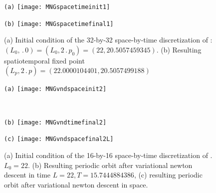 

\begin{figure}[ht]
\begin{minipage}[height=.32\textheight]{.45\textwidth}
\centering \small{\texttt{(a)}}
\texttt{[image: MNGspacetimeinit1]}
\end{minipage}
\begin{minipage}[height=.32\textheight]{.45\textwidth}
\centering \small{\texttt{(b)}}
\texttt{[image: MNGspacetimefinal1]}
\end{minipage}
\caption{ \label{fig:MNGspacetime11}
(a) Initial condition of the 32-by-32 space-by-time discretization of :
$(L_0,\period{0}) = (L_0, 2\period{p_0})= (22,20.5057459345)$.
(b) Resulting spatiotemporal fixed point
$(L_p,2\period{p}) =  (22.0000104401, 20.5057499188)$
}
\end{figure}

\begin{figure}
\begin{minipage}[height=.32\textheight]{.45\textwidth}
\centering \small{\texttt{(a)}}
\texttt{[image: MNGvndspaceinit2]}
\end{minipage}
\\
\begin{minipage}[height=.32\textheight]{.45\textwidth}
\centering \small{\texttt{(b)}}
\texttt{[image: MNGvndtimefinal2]}
\end{minipage}
\begin{minipage}[height=.32\textheight]{.45\textwidth}
\centering \small{\texttt{(c)}}
\texttt{[image: MNGvndspacefinal2L]}
\end{minipage}
\caption{ \label{fig:MNGspaceandtime1}
(a) Initial condition of the 16-by-16 space-by-time discretization of
. $L_0 = 22$.
(b) Resulting periodic orbit after variational {newton descent} in time $L =
22, T = 15.7444884386$,
(c) resulting periodic orbit after variational {newton descent} in space.
}
\end{figure}


